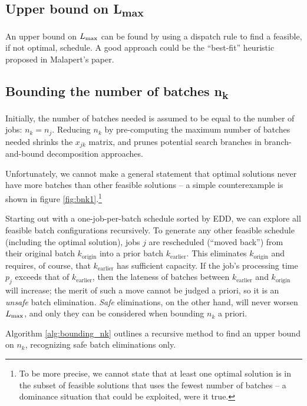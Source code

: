 \documentclass[13pt, letterpaper, oneside]{book}
\begin{document}
\subsection[Upper bound on $\Lmax$]{Upper bound on {\sansitalicfont L}\textsubscript{max}}
An upper bound on $\Lmax$ can be found by using a dispatch rule to find a
feasible, if not optimal, schedule. A good approach could be the ``best-fit''
heuristic proposed in Malapert's paper. 

\subsection[Bounding the number of batches $n_k$]{Bounding the number of batches
\sansitalicfont n\textsubscript{k}}\label{sec:bounding_nk}
Initially, the number of batches needed is assumed to be equal to the number of
jobs: $n_k = n_j$. Reducing $n_k$ by pre-computing the maximum number of batches
needed shrinks the $x_{jk}$ matrix, and prunes potential search branches in
branch-and-bound decomposition approaches.


Unfortunately, we cannot make a general statement that optimal solutions never
have more batches than other feasible solutions -- a simple counterexample is
shown in figure \ref{fig:bnk1}.\footnote{To be more precise, we cannot state
that at least one optimal solution is in the subset of feasible solutions that
uses the fewest number of batches -- a dominance situation that could be
exploited, were it true.}

Starting out with a one-job-per-batch schedule sorted by EDD, we can explore
all feasible batch configurations recursively. To generate any other feasible
schedule (including the optimal solution), jobs $j$ are rescheduled (``moved back'')
from their original batch $k_\text{origin}$ into a prior batch
$k_\text{earlier}$. This eliminates $k_\text{origin}$ and requires, of course,
that $k_\text{earlier}$ has sufficient capacity. If the job's processing time
$p_j$ exceeds that of $k_\text{earlier}$, then the lateness of batches between
$k_\text{earlier}$ and $k_\text{origin}$ will increase; the merit of such a move
cannot be judged a priori, so it is an \textit{unsafe} batch elimination.
\textit{Safe} eliminations, on the other hand, will never worsen $\Lmax$, and
only they can be considered when bounding $n_k$ a priori.

Algorithm \ref{alg:bounding_nk} outlines a recursive method to find an upper
bound on $n_k$, recognizing safe batch eliminations only.
\end{document}
